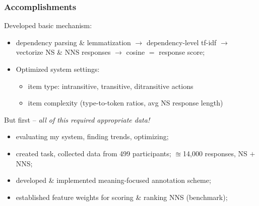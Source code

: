 \documentclass[xcolor={dvipsnames}]{beamer}
\begin{document}
%
%


\begin{frame}
\frametitle{Accomplishments}
\small
\pause
Developed basic mechanism:
\begin{itemize}
\pause
\item dependency parsing \& lemmatization \pause $\rightarrow$ dependency-level tf-idf \pause $\rightarrow$ vectorize NS \& NNS responses \pause $\rightarrow$ cosine $=$ response score;
\pause
\item Optimized system settings:
\pause
\begin{itemize}
\item item type: intransitive, transitive, ditransitive actions
\pause
\item item complexity (type-to-token ratios, avg NS response length)
\end{itemize}
\end{itemize}
\pause
But first -- \textit{all of this required appropriate data!}
\begin{itemize}
\pause
\item evaluating my system, finding trends, optimizing;
\pause
\item created task, collected data from 499 participants; $\approxeq$14,000 responses, NS $+$ NNS;
\pause
\item developed \& implemented meaning-focused annotation scheme;
\pause
\item established feature weights for scoring \& ranking NNS (benchmark);
\end{itemize}
\end{frame}
\end{document}
